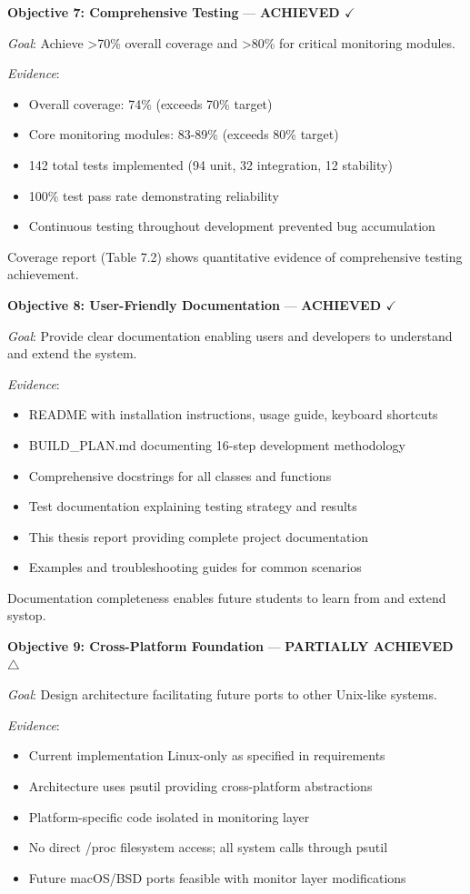 \documentclass[12pt,a4paper,oneside]{report}
\begin{document}
\textbf{Objective 7: Comprehensive Testing} --- \textbf{ACHIEVED $\checkmark$}

\textit{Goal}: Achieve >70\% overall coverage and >80\% for critical monitoring modules.

\textit{Evidence}:
\begin{itemize}
    \item Overall coverage: 74\% (exceeds 70\% target)
    \item Core monitoring modules: 83-89\% (exceeds 80\% target)
    \item 142 total tests implemented (94 unit, 32 integration, 12 stability)
    \item 100\% test pass rate demonstrating reliability
    \item Continuous testing throughout development prevented bug accumulation
\end{itemize}

Coverage report (Table 7.2) shows quantitative evidence of comprehensive testing achievement.

\textbf{Objective 8: User-Friendly Documentation} --- \textbf{ACHIEVED $\checkmark$}

\textit{Goal}: Provide clear documentation enabling users and developers to understand and extend the system.

\textit{Evidence}:
\begin{itemize}
    \item README with installation instructions, usage guide, keyboard shortcuts
    \item BUILD\_PLAN.md documenting 16-step development methodology
    \item Comprehensive docstrings for all classes and functions
    \item Test documentation explaining testing strategy and results
    \item This thesis report providing complete project documentation
    \item Examples and troubleshooting guides for common scenarios
\end{itemize}

Documentation completeness enables future students to learn from and extend systop.

\textbf{Objective 9: Cross-Platform Foundation} --- \textbf{PARTIALLY ACHIEVED $\triangle$}

\textit{Goal}: Design architecture facilitating future ports to other Unix-like systems.

\textit{Evidence}:
\begin{itemize}
    \item Current implementation Linux-only as specified in requirements
    \item Architecture uses psutil providing cross-platform abstractions
    \item Platform-specific code isolated in monitoring layer
    \item No direct /proc filesystem access; all system calls through psutil
    \item Future macOS/BSD ports feasible with monitor layer modifications
\end{itemize}
\end{document}
